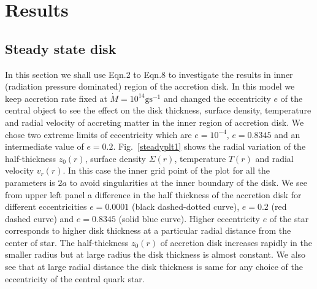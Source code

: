 \documentclass[useAMS,usenatbib]{mn2e}
\begin{document}
\section{Results}
\subsection{Steady state disk}
In this section we shall use Eqn.2 to Eqn.8 to investigate the results in inner (radiation pressure dominated) region of the accretion disk. In this model we keep accretion rate fixed at $\dot{M} = 10^{14}\textrm{g}\textrm{s}^{-1}$ and changed the eccentricity $e$ of the central object to see the effect on the disk thickness, surface density, temperature and radial velocity of accreting matter in the inner region of accretion disk. We chose two extreme limits of eccentricity which are $e = 10^{-4}$, $e = 0.8345$ and an intermediate value of $e = 0.2$. Fig.~\ref{steadyplt1} shows the radial variation of the half-thickness $z_0(r)$, surface density $\Sigma(r)$, temperature $T(r)$ and radial velocity $v_r(r)$. In this case the inner grid point of the plot for all the parameters is $2a$ to avoid singularities at the inner boundary of the disk. We see from upper left panel a difference in the half thickness of the accretion disk for different eccentricities $e =0.0001$ (black dashed-dotted curve), $e = 0.2$ (red dashed curve) and $e = 0.8345$ (solid blue curve). Higher eccentricity $e$ of the star corresponds to higher disk thickness at a particular radial distance from the center of star. The half-thickness $z_0(r)$ of accretion disk increases rapidly in the smaller radius but at large radius the disk thickness is almost constant. We also see that at large radial distance the disk thickness is same for any choice of the eccentricity of the central quark star. 
\end{document}
